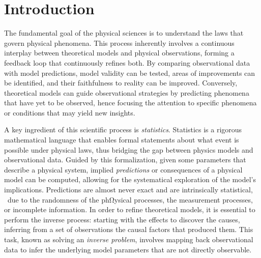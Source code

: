 \chapter{Introduction} \label{sec:introduction}

The fundamental goal of the physical sciences is to understand the laws that govern physical phenomena.
This process inherently involves a continuous interplay between theoretical models and physical observations, forming a feedback loop that continuously refines both. By comparing observational data with model predictions, model validity can be tested, areas of improvements can be identified, and their faithfulness to reality can be improved. Conversely, theoretical models can guide observational strategies by predicting phenomena that have yet to be observed, hence focusing the attention to specific phenomena or conditions that may yield new insights.

A key ingredient of this scientific process is \emph{statistics}. Statistics is a rigorous mathematical language that enables formal statements about what event is possible under physical laws, thus bridging the gap between physics models and observational data.
Guided by this formalization, given some parameters that describe a physical system, implied \emph{predictions} or consequences of a physical model can be computed, allowing for the systematical exploration of the model's implications. Predictions are almost never exact and are intrinsically statistical, \eg\ due to the randomness of the phΩysical processes, the measurement processes, or incomplete information.
In order to refine theoretical models, it is essential to perform the inverse process: starting with the effects to discover the causes, inferring from a set of observations the causal factors that produced them. This task, known as solving an \emph{inverse problem}, involves mapping back observational data to infer the underlying model parameters that are not directly observable.


